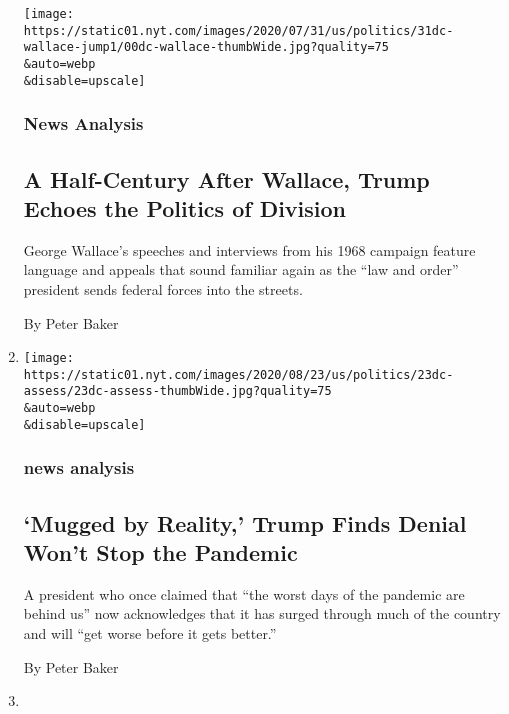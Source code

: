 \begin{enumerate}
  \texttt{[image: https://static01.nyt.com/images/2020/07/31/us/politics/31dc-wallace-jump1/00dc-wallace-thumbWide.jpg?quality=75\\\&auto=webp\\\&disable=upscale]}

  \hypertarget{news-analysis-1}{%
  \subsubsection{News Analysis}\label{news-analysis-1}}

  \hypertarget{a-half-century-after-wallace-trump-echoes-the-politics-of-division}{%
  \subsection{A Half-Century After Wallace, Trump Echoes the Politics of
  Division}\label{a-half-century-after-wallace-trump-echoes-the-politics-of-division}}

  George Wallace's speeches and interviews from his 1968 campaign
  feature language and appeals that sound familiar again as the ``law
  and order'' president sends federal forces into the streets.

  By Peter Baker
\item
  \href{/2020/07/24/us/politics/coronavirus-trump-denial.html}{}

  \texttt{[image: https://static01.nyt.com/images/2020/08/23/us/politics/23dc-assess/23dc-assess-thumbWide.jpg?quality=75\\\&auto=webp\\\&disable=upscale]}

  \hypertarget{news-analysis-2}{%
  \subsubsection{news analysis}\label{news-analysis-2}}

  \hypertarget{mugged-by-reality-trump-finds-denial-wont-stop-the-pandemic}{%
  \subsection{`Mugged by Reality,' Trump Finds Denial Won't Stop the
  Pandemic}\label{mugged-by-reality-trump-finds-denial-wont-stop-the-pandemic}}

  A president who once claimed that ``the worst days of the pandemic are
  behind us'' now acknowledges that it has surged through much of the
  country and will ``get worse before it gets better.''

  By Peter Baker
\item
  \href{/2020/07/23/us/politics/person-woman-man-camera-tv-trump.html}{}


\end{enumerate}
